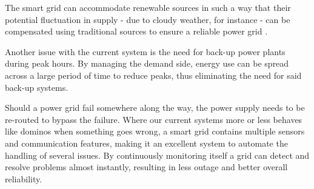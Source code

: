 
The smart grid can accommodate renewable sources in such a way that their potential fluctuation in supply - due to cloudy weather, for instance - can be compensated using traditional sources to ensure a reliable power grid . 

Another issue with the current system is the need for back-up power plants during peak hours. By managing the demand side, energy use can be spread across a large period of time to reduce peaks, thus eliminating the need for said back-up systems. 

Should a power grid fail somewhere along the way, the power supply needs to be re-routed to bypass the failure. Where our current systems more or less behaves like dominos when something goes wrong,  a smart grid contains multiple sensors and communication features, making it an excellent system to automate the handling of several issues. By continuously monitoring itself a grid can detect and resolve problems almost instantly, resulting in less outage and better overall reliability.



